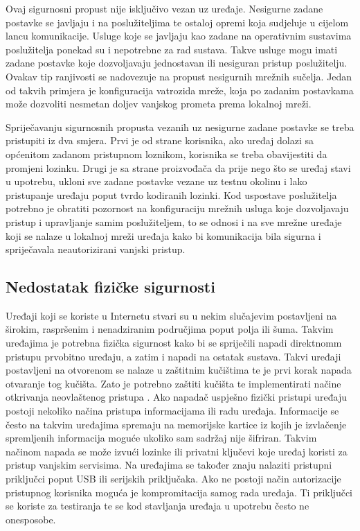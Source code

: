 \documentclass[times, utf8, diplomski]{fer}
\begin{document}
Ovaj sigurnosni propust nije isključivo vezan uz uređaje. Nesigurne zadane postavke se javljaju i na poslužiteljima te ostaloj opremi koja sudjeluje u cijelom lancu komunikacije. Usluge koje se javljaju kao zadane na operativnim sustavima poslužitelja ponekad su i nepotrebne za rad sustava. Takve usluge mogu imati zadane postavke koje dozvoljavaju jednostavan ili nesiguran pristup poslužitelju. Ovakav tip ranjivosti se nadovezuje na propust nesigurnih mrežnih sučelja. Jedan od takvih primjera je konfiguracija vatrozida mreže, koja po zadanim postavkama može dozvoliti nesmetan doljev vanjskog prometa prema lokalnoj mreži.  

Spriječavanju sigurnosnih propusta vezanih uz nesigurne zadane postavke se treba pristupiti iz dva smjera. Prvi je od strane korisnika, ako uređaj dolazi sa općenitom zadanom pristupnom loznikom, korisnika se treba obavijestiti da promjeni lozinku. Drugi je sa strane proizvođača da prije nego što se uređaj stavi u upotrebu, ukloni sve zadane postavke vezane uz testnu okolinu i lako pristupanje uređaju poput tvrdo kodiranih lozinki. Kod uspostave poslužitelja potrebno je obratiti pozornost na konfiguraciju mrežnih usluga koje dozvoljavaju pristup i upravljanje samim poslužiteljem, to se odnosi i na sve mrežne uređaje koji se nalaze u lokalnoj mreži uređaja kako bi komunikacija bila sigurna i spriječavala neautorizirani vanjski pristup.

\subsection{Nedostatak fizičke sigurnosti}
Uređaji koji se koriste u Internetu stvari su u nekim slučajevim postavljeni na širokim, raspršenim  i nenadziranim područjima poput polja ili šuma. Takvim uređajima je potrebna fizička sigurnost kako bi se spriječili napadi direktnomm pristupu prvobitno uređaju, a zatim i napadi na ostatak sustava. Takvi uređaji postavljeni na otvorenom se nalaze u zaštitnim kučištima te je prvi korak napada otvaranje tog kučišta. Zato je potrebno zaštiti kučišta te implementirati načine otkrivanja neovlaštenog pristupa . Ako napadač uspješno fizički pristupi uređaju postoji nekoliko načina pristupa informacijama ili radu uređaja. Informacije se često na takvim uređajima spremaju na memorijske kartice iz kojih je izvlačenje spremljenih informacija moguće ukoliko sam sadržaj nije šifriran. Takvim načinom napada se može izvući lozinke ili privatni ključevi koje uređaj koristi za pristup vanjskim servisima. Na uređajima se također znaju nalaziti pristupni priključci poput USB ili serijskih priključaka. Ako ne postoji način autorizacije pristupnog korisnika moguća je kompromitacija samog rada uređaja. Ti priključci se koriste za testiranja te se kod stavljanja uređaja u upotrebu često ne onesposobe.
\end{document}

